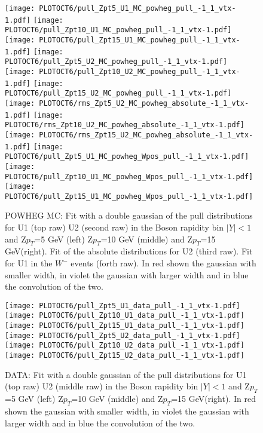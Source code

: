\documentclass[41pt,a4paper,oneside]{report}
\begin{document}
\begin{figure}[h!]
  \begin{center}
    \texttt{[image: PLOTOCT6/pull\_Zpt5\_U1\_MC\_powheg\_pull\_-1\_1\_vtx-1.pdf]}
    \texttt{[image: PLOTOCT6/pull\_Zpt10\_U1\_MC\_powheg\_pull\_-1\_1\_vtx-1.pdf]}
    \texttt{[image: PLOTOCT6/pull\_Zpt15\_U1\_MC\_powheg\_pull\_-1\_1\_vtx-1.pdf]}
    \texttt{[image: PLOTOCT6/pull\_Zpt5\_U2\_MC\_powheg\_pull\_-1\_1\_vtx-1.pdf]}
    \texttt{[image: PLOTOCT6/pull\_Zpt10\_U2\_MC\_powheg\_pull\_-1\_1\_vtx-1.pdf]}
    \texttt{[image: PLOTOCT6/pull\_Zpt15\_U2\_MC\_powheg\_pull\_-1\_1\_vtx-1.pdf]}
    \texttt{[image: PLOTOCT6/rms\_Zpt5\_U2\_MC\_powheg\_absolute\_-1\_1\_vtx-1.pdf]}
    \texttt{[image: PLOTOCT6/rms\_Zpt10\_U2\_MC\_powheg\_absolute\_-1\_1\_vtx-1.pdf]}
    \texttt{[image: PLOTOCT6/rms\_Zpt15\_U2\_MC\_powheg\_absolute\_-1\_1\_vtx-1.pdf]}
    \texttt{[image: PLOTOCT6/pull\_Zpt5\_U1\_MC\_powheg\_Wpos\_pull\_-1\_1\_vtx-1.pdf]}     
    \texttt{[image: PLOTOCT6/pull\_Zpt10\_U1\_MC\_powheg\_Wpos\_pull\_-1\_1\_vtx-1.pdf]}
    \texttt{[image: PLOTOCT6/pull\_Zpt15\_U1\_MC\_powheg\_Wpos\_pull\_-1\_1\_vtx-1.pdf]}
    \caption{POWHEG MC: Fit with a double gaussian of the pull distributions for U1 (top raw) U2 (second raw) in the Boson rapidity bin $|Y|<1$ and Z$p_{T}$=5 GeV (left) Z$p_{T}$=10 GeV (middle) and Z$p_{T}$=15 GeV(right). Fit of the absolute distributions for U2 (third raw). Fit for U1 in the $W^{-}$ events (forth raw). In red shown the gaussian with smaller width, in violet the gaussian with larger width and in blue the convolution of the two.}
    \label{fig:PullPOW}
  \end{center}
\end{figure}
\begin{figure}[h!]
  \begin{center}
    \texttt{[image: PLOTOCT6/pull\_Zpt5\_U1\_data\_pull\_-1\_1\_vtx-1.pdf]}
    \texttt{[image: PLOTOCT6/pull\_Zpt10\_U1\_data\_pull\_-1\_1\_vtx-1.pdf]}
    \texttt{[image: PLOTOCT6/pull\_Zpt15\_U1\_data\_pull\_-1\_1\_vtx-1.pdf]}
    \texttt{[image: PLOTOCT6/pull\_Zpt5\_U2\_data\_pull\_-1\_1\_vtx-1.pdf]}
    \texttt{[image: PLOTOCT6/pull\_Zpt10\_U2\_data\_pull\_-1\_1\_vtx-1.pdf]}
    \texttt{[image: PLOTOCT6/pull\_Zpt15\_U2\_data\_pull\_-1\_1\_vtx-1.pdf]}
    \caption{DATA: Fit with a double gaussian of the pull distributions for U1 (top raw) U2 (middle raw) in the Boson rapidity bin $|Y|<1$ and Z$p_{T}$=5 GeV (left) Z$p_{T}$=10 GeV (middle) and Z$p_{T}$=15 GeV(right). In red shown the gaussian with smaller width, in violet the gaussian with larger width and in blue the convolution of the two.}
    \label{fig:PullData}
  \end{center}
\end{figure}
\end{document}

